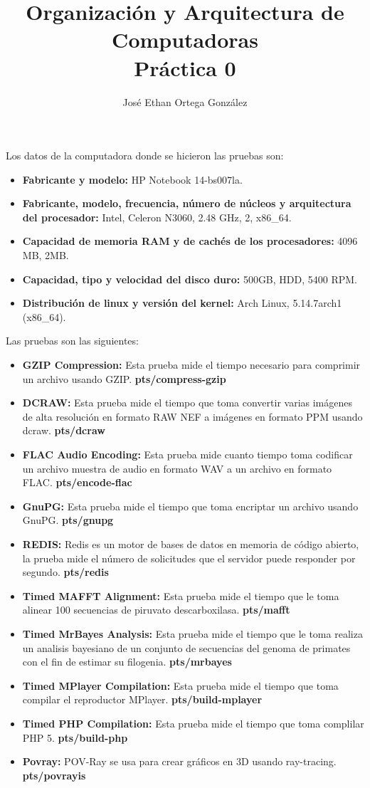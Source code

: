 \documentclass[12pt]{article}
\title{
  \vspace{-4.0cm}
  \huge Organización y Arquitectura de Computadoras \\[0.25cm]
  \LARGE Práctica 0
}
\author{José Ethan Ortega González}
\begin{document}
\maketitle{}
Los datos de la computadora donde se hicieron las pruebas son:
\begin{itemize}
  \item \textbf{Fabricante y modelo:}  HP Notebook 14-bs007la.
  \item \textbf{Fabricante, modelo, frecuencia, número de núcleos y arquitectura
        del procesador:} Intel, Celeron N3060, 2.48 GHz, 2, x86\_64.
  \item \textbf{Capacidad de memoria RAM y de cachés de los procesadores:} 4096
        MB, 2MB.
  \item \textbf{Capacidad, tipo y velocidad del disco duro:} 500GB, HDD, 5400
        RPM.
  \item \textbf{Distribución de linux y versión del kernel:} Arch Linux,
        5.14.7\-arch1 (x86\_64).
\end{itemize}
Las pruebas son las siguientes:
\begin{itemize}
  \item \textbf{GZIP Compression:} Esta prueba mide el tiempo necesario para
        comprimir un archivo usando GZIP. \textbf{pts/compress-gzip}
  \item \textbf{DCRAW:} Esta prueba mide el tiempo que toma convertir varias
        imágenes de alta resolución en formato RAW NEF a imágenes en formato
        PPM usando dcraw. \textbf{pts/dcraw}
  \item \textbf{FLAC Audio Encoding:} Esta prueba mide cuanto tiempo toma
        codificar un archivo muestra de audio en formato WAV a un archivo en
        formato FLAC. \textbf{pts/encode-flac}
  \item \textbf{GnuPG:} Esta prueba mide el tiempo que toma encriptar un archivo
        usando GnuPG. \textbf{pts/gnupg}
  \item \textbf{REDIS:} Redis es un motor de bases de datos en memoria de código
        abierto, la prueba mide el número de solicitudes que el servidor puede
        responder por segundo. \textbf{pts/redis}
  \item \textbf{Timed MAFFT Alignment:} Esta prueba mide el tiempo que le toma
        alinear 100 secuencias de piruvato descarboxilasa. \textbf{pts/mafft}
  \item \textbf{Timed MrBayes Analysis:} Esta prueba mide el tiempo que le toma
        realiza un analisis bayesiano de un conjunto de secuencias del genoma de
        primates con el fin de estimar su filogenia. \textbf{pts/mrbayes}
  \item \textbf{Timed MPlayer Compilation:} Esta prueba mide el tiempo que toma
        compilar el reproductor MPlayer. \textbf{pts/build-mplayer}
  \item \textbf{Timed PHP Compilation:} Esta prueba mide el tiempo que toma
        complilar PHP 5. \textbf{pts/build-php}
  \item \textbf{Povray:} POV-Ray se usa para crear gráficos en 3D usando
        ray-tracing. \textbf{pts/povrayis}
\end{itemize}
\end{document}
